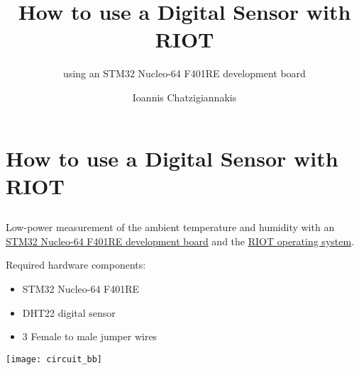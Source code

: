 \documentclass[aspectratio=169]{beamer}
\title[Lecture 1]{How to use a Digital Sensor with RIOT}
\subtitle{using an STM32 Nucleo-64 F401RE development board}
\author[I.Chatzigiannakis]{Ioannis Chatzigiannakis}
\institute{\url{https://github.com/ichatz/riotos-apps}}
\date{}
\begin{document}
{

\frame{\titlepage}

}

\section{How to use a Digital Sensor with RIOT}

\subsection{}

\begin{frame}{}

\begin{block}{}
Low-power measurement of the ambient temperature and humidity with an \href{https://www.st.com/en/evaluation-tools/nucleo-f401re.html}{STM32 Nucleo-64 F401RE development board} and the \href{https://github.com/RIOT-OS/RIOT}{RIOT operating system}.
\end{block}

\bigskip

Required hardware components:

\begin{itemize}
	
\item<1-> STM32 Nucleo-64 F401RE

\item<2-> DHT22 digital sensor

\item<3> 3 Female to male jumper wires

\end{itemize}
\end{frame}



\begin{frame}{}
\vspace{.2cm}
\hspace*{1cm}
\texttt{[image: circuit\_bb]}
\end{frame}
\end{document}
